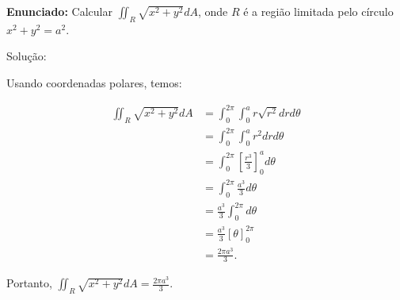 \documentclass{article}
\begin{document}
\textbf{Enunciado:} Calcular $\iint_R \sqrt{x^2+y^2} dA$, onde $R$ é a região limitada pelo círculo $x^2+y^2=a^2$.

Solução:

Usando coordenadas polares, temos:

\begin{align*}
\iint_R \sqrt{x^2+y^2} dA &= \int_{0}^{2\pi} \int_{0}^{a} r\sqrt{r^2}drd\theta \\
&= \int_{0}^{2\pi} \int_{0}^{a} r^2 drd\theta \\
&= \int_{0}^{2\pi} \left[\frac{r^3}{3}\right]_{0}^{a} d\theta \\
&= \int_{0}^{2\pi} \frac{a^3}{3} d\theta \\
&= \frac{a^3}{3} \int_{0}^{2\pi} d\theta \\
&= \frac{a^3}{3} \left[\theta\right]_{0}^{2\pi} \\
&= \frac{2\pi a^3}{3}.
\end{align*}

Portanto, $\iint_R \sqrt{x^2+y^2} dA = \frac{2\pi a^3}{3}$.
\end{document}
